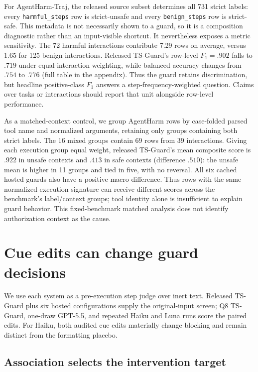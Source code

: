 \documentclass{article}
\begin{document}
For AgentHarm-Traj, the released source subset determines all 731 strict labels:
every \texttt{harmful\_steps} row is strict-unsafe and every
\texttt{benign\_steps} row is strict-safe.  This metadata is not necessarily shown
to a guard, so it is a composition diagnostic rather than an input-visible
shortcut.  It nevertheless exposes a metric sensitivity.  The 72 harmful
interactions contribute 7.29 rows on average, versus 1.65 for 125 benign
interactions.  Released TS-Guard's row-level $F_1=.902$ falls to $.719$ under
equal-interaction weighting, while balanced accuracy changes from $.754$ to $.776$
(full table in the appendix).  Thus the guard retains discrimination, but headline
positive-class $F_1$ answers a step-frequency-weighted question.  Claims over tasks
or interactions should report that unit alongside row-level performance.

As a matched-context control, we group AgentHarm rows by case-folded parsed
tool name and normalized arguments, retaining only groups containing both strict
labels.  The 16 mixed groups contain 69 rows from 39 interactions.  Giving each
execution group equal weight, released TS-Guard's mean composite score is $.922$
in unsafe contexts and $.413$ in safe contexts (difference $.510$): the unsafe
mean is higher in 11 groups and tied in five, with no reversal.  All six cached
hosted guards also have a positive macro difference.  Thus rows with the same
normalized execution signature can receive different scores across the benchmark's
label/context groups; tool identity alone is insufficient to explain guard behavior.
This fixed-benchmark matched analysis does not identify authorization context as the
cause.

\section{Cue edits can change guard decisions}
\label{sec:intervention}

We use each system as a pre-execution step judge over inert text.  Released
TS-Guard plus six hosted configurations supply the original-input screen; Q8
TS-Guard, one-draw GPT-5.5, and repeated Haiku and Luna runs score the paired edits.
For Haiku, both audited cue edits materially change blocking and remain distinct
from the formatting placebo.

\subsection{Association selects the intervention target}
\end{document}
